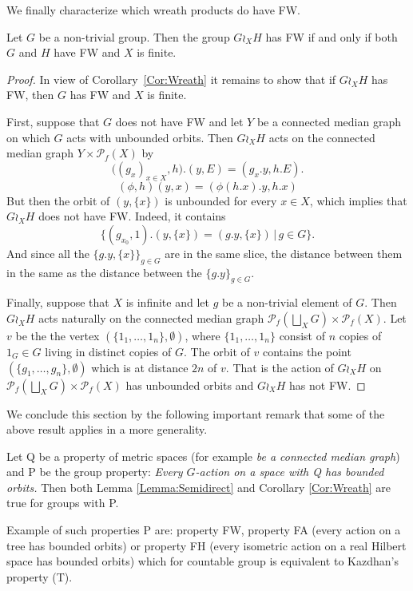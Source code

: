 We finally characterize which wreath products do have FW.
\begin{prop}
Let $G$ be a non-trivial group.
Then the group $G\wr_X H$ has FW if and only if both $G$ and $H$ have FW and $X$ is finite.
\end{prop}
\begin{proof}
In view of Corollary~\ref{Cor:Wreath} it remains to show that if $G\wr_X H$ has FW, then $G$ has FW and $X$ is finite.

First, suppose that $G$ does not have FW and let $Y$ be a connected median graph on which $G$ acts with unbounded orbits.
Then $G\wr_X H$ acts on the connected median graph $Y\times \mathcal P_f(X)$ by
\[
	\bigl((g_x)_{x\in X},h\bigr).(y,E)=(g_x.y,h.E).
\]
\[(\phi,h)(y,x) = (\phi(h.x).y, h.x)
\]
But then the orbit of $(y,\{x\})$ is unbounded for every $x\in X$, which implies that $G\wr_X H$ does not have FW.
Indeed, it contains
\[
	\{(g_{x_0},1).(y,\{x\})=(g.y,\{x\})\,|\,g\in G\}.
\]
And since all the $\{g.y,\{x\}\}_{g\in G}$ are in the same slice, the distance between them in the same as the distance between the $\{g.y\}_{g\in G}$.

Finally, suppose that $X$ is infinite and let $g$ be a non-trivial element of $G$.
Then $G\wr_X H$ acts naturally on the connected median graph $\mathcal P_f(\bigsqcup_XG)\times \mathcal P_f(X)$.
Let $v$ be the the vertex $(\{1_1,\dots, 1_n\},\emptyset)$, where $\{1_1,\dots, 1_n\}$ consist of $n$ copies of $1_G\in G$ living in distinct copies of $G$.
The orbit of $v$ contains the point $(\{g_1,\dots, g_n\},\emptyset)$ which is at distance $2n$ of $v$.
That is the action of $G\wr_X H$ on $\mathcal P_f(\bigsqcup_XG)\times \mathcal P_f(X)$ has unbounded orbits and $G\wr_X H$ has not FW.
\end{proof}

We conclude this section by the following important remark that some of the above result applies in a more generality.
\begin{rem}
Let Q be a property of metric spaces (for example \emph{be a connected median graph}) and P be the group property: \emph{Every $G$-action on a space with Q has bounded orbits.}
Then both Lemma \ref{Lemma:Semidirect} and Corollary \ref{Cor:Wreath} are true for groups with P.

Example of such properties P are: property FW, property FA (every action on a tree has bounded orbits) or property FH (every isometric action on a real Hilbert space has bounded orbits) which for countable group is equivalent to Kazdhan's property (T).
\end{rem}

